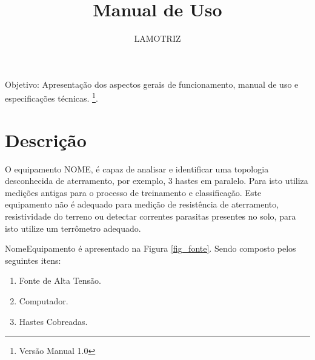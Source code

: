 \documentclass[a4paper, 10pt]{article}
\title{Manual de Uso}
\author{LAMOTRIZ}
\begin{document}
\maketitle

Objetivo: Apresentação dos aspectos gerais de funcionamento, manual de uso e 
especificações técnicas.
\footnote{Versão Manual 1.0}.


\newpage

\tableofcontents

\newpage

\listoffigures

\newpage

\section{Descrição}

O equipamento NOME, é capaz de analisar e identificar uma topologia desconhecida 
de aterramento, por exemplo, 3 hastes em paralelo. 
Para isto utiliza medições antigas para o processo de treinamento e 
classificação. Este equipamento não é adequado para medição de 
resistência de aterramento, resistividade do terreno ou detectar correntes 
parasitas presentes no solo, para isto utilize um terrômetro adequado. 

NomeEquipamento é apresentado na Figura \ref{fig_fonte}. Sendo composto pelos 
seguintes itens:


\begin{enumerate}
    \item Fonte de Alta Tensão.
    \item Computador.
    \item Hastes Cobreadas.
\end{enumerate}
\end{document}
